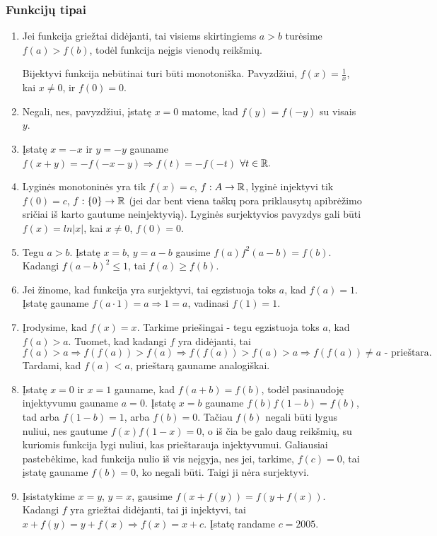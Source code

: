 \subsubsection*{Funkcijų tipai}
\begin{enumerate} 
\item 
Jei funkcija griežtai didėjanti, tai visiems skirtingiems $a>b$
turėsime $f(a)>f(b)$, todėl funkcija neįgis vienodų reikšmių. 

Bijektyvi funkcija nebūtinai turi būti monotoniška. Pavyzdžiui,
$f(x)=\frac{1}{x}$, kai $x\neq 0$, ir $f(0)=0$.
\item 
Negali, nes, pavyzdžiui, įstatę $x=0$ matome, kad $f(y)=f(-y)$ su visais $y$.
\item 
Įstatę $x=-x$ ir $y=-y$ gauname $f(x+y) = -f(-x-y)\Rightarrow
f(t)=-f(-t)$ $\forall t \in \mathbb R.$
\item 
Lyginės monotoninės yra tik $f(x)=c$, $f:A\to \mathbb R$, lyginė injektyvi
tik $f(0)=c$, $f:\{0\}\to \mathbb R$ (jei dar bent viena taškų pora
priklausytų apibrėžimo sričiai iš karto gautume neinjektyvią). Lyginės
surjektyvios pavyzdys gali būti $f(x)=ln|x|$, kai $x\neq 0$, $f(0)=0$.
\item 
Tegu $a>b$. Įstatę $x =b$, $y = a-b$ gausime $f(a)f^2(a-b)=f(b)$.
Kadangi $f(a-b)^2\leq 1$, tai $f(a)\geq f(b)$.
\item 
Jei žinome, kad funkcija yra surjektyvi, tai egzistuoja toks $a$, kad
$f(a)=1$. Įstatę gauname $f(a\cdot 1) =a \Rightarrow 1 = a$, vadinasi
$f(1)=1$.
\item 
Įrodysime, kad $f(x)=x$. Tarkime priešingai - tegu egzistuoja toks
$a$, kad $f(a)>a$. Tuomet, kad kadangi $f$ yra didėjanti, tai $$f(a)>a
\Rightarrow f(f(a))>f(a) \Rightarrow f(f(a))>f(a)>a \Rightarrow
f(f(a))\neq a \text { - prieštara}.$$ Tardami, kad $f(a)<a$, prieštarą
gauname analogiškai.
\item 
Įstatę $x=0$ ir $x=1$ gauname, kad $f(a+b)=f(b)$, todėl pasinaudoję injektyvumu gauname $a = 0$.
Įstatę $x=b$ gauname $f(b)f(1-b)=f(b)$, tad arba $f(1-b)=1$, arba
$f(b)=0$. Tačiau $f(b)$ negali būti lygus nuliui, nes gautume
$f(x)f(1-x)=0$, o iš čia be galo daug reikšmių, su kuriomis funkcija
lygi nuliui, kas prieštarauja injektyvumui.
Galiausiai pastebėkime, kad funkcija nulio iš vis neįgyja, nes jei,
tarkime, $f(c)=0$, tai įstatę gauname $f(b)=0$, ko negali būti. Taigi
ji nėra surjektyvi.
\item 
Įsistatykime $x=y$, $y=x$, gausime $f(x+f(y))=f(y+f(x))$. Kadangi $f$
yra griežtai didėjanti, tai ji injektyvi, tai $x+f(y)=y+f(x)
\Rightarrow f(x)=x+c$. Įstatę randame $c=2005$.

\end{enumerate}
